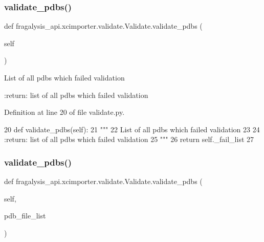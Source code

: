 \subsubsection{\texorpdfstring{validate\+\_\+pdbs()}{validate\_pdbs()}\hspace{0.1cm}{\footnotesize\ttfamily [1/2]}}
{\footnotesize\ttfamily def fragalysis\+\_\+api.\+xcimporter.\+validate.\+Validate.\+validate\+\_\+pdbs (\begin{DoxyParamCaption}\item[{}]{self }\end{DoxyParamCaption})}

\begin{DoxyVerb}List of all pdbs which failed validation

:return: list of all pdbs which failed validation
\end{DoxyVerb}
 

Definition at line 20 of file validate.\+py.


\begin{DoxyCode}
20     \textcolor{keyword}{def }validate\_pdbs(self):
21         \textcolor{stringliteral}{"""}
22 \textcolor{stringliteral}{        List of all pdbs which failed validation}
23 \textcolor{stringliteral}{}
24 \textcolor{stringliteral}{        :return: list of all pdbs which failed validation}
25 \textcolor{stringliteral}{        """}
26         \textcolor{keywordflow}{return} self.\_fail\_list
27 
\end{DoxyCode}
\mbox{\label{classfragalysis__api_1_1xcimporter_1_1validate_1_1_validate_a2efb516ce319ed46c758ffbf70056df1}} 
\subsubsection{\texorpdfstring{validate\+\_\+pdbs()}{validate\_pdbs()}\hspace{0.1cm}{\footnotesize\ttfamily [2/2]}}
{\footnotesize\ttfamily def fragalysis\+\_\+api.\+xcimporter.\+validate.\+Validate.\+validate\+\_\+pdbs (\begin{DoxyParamCaption}\item[{}]{self,  }\item[{}]{pdb\+\_\+file\+\_\+list }\end{DoxyParamCaption})}



